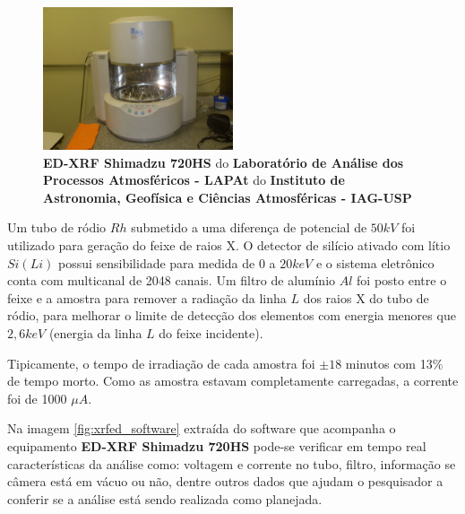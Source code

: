 \begin{figure}[H]
\begin{center}
  \includegraphics[width=0.5\textwidth]{../inputs/images/xrf-ed-IAG-USP.jpg}
  \caption{\textbf{ED-XRF Shimadzu 720HS} do \textbf{Laboratório de Análise dos Processos Atmosféricos - LAPAt} do
           \textbf{Instituto de Astronomia, Geofísica e Ciências Atmosféricas - IAG-USP} \label{fig:xrfed_iag}}
\end{center}
\end{figure}

Um tubo de ródio $Rh$ submetido a uma diferença de potencial 
de $50 kV$ foi utilizado para geração do feixe de raios X.
O detector de silício ativado com lítio $Si(Li)$ possui sensibilidade
para medida de $0$ a $20 keV$ e o sistema eletrônico conta com multicanal 
de 2048 canais.
Um filtro de alumínio $Al$ foi posto entre o feixe e a amostra para remover
a radiação da linha $L$ dos raios X do tubo de ródio, para melhorar o limite
de detecção dos elementos com energia menores que $2,6 keV$ (energia da linha
$L$ do feixe incidente).

Tipicamente, o tempo de irradiação de cada amostra foi $\pm 18$ minutos com 
13\% de tempo morto. Como as amostra estavam completamente carregadas, 
a corrente foi de 1000 $\mu A$. 

Na imagem \ref{fig:xrfed_software} extraída do software que acompanha o equipamento
\textbf{ED-XRF Shimadzu 720HS} pode-se verificar em tempo real características da
análise como: voltagem e corrente no tubo, filtro, informação se câmera está 
em vácuo ou não, dentre outros dados que ajudam o pesquisador a conferir se 
a análise está sendo realizada como planejada. 

